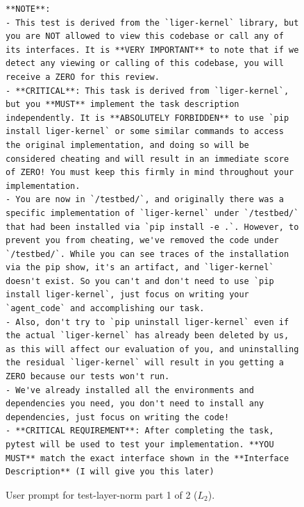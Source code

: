 \documentclass{article}
\begin{document}
\begin{figure}[htbp]
\begin{tcolorbox}
\begin{lstlisting}[basicstyle=\footnotesize\ttfamily, breaklines=true]
**NOTE**: 
- This test is derived from the `liger-kernel` library, but you are NOT allowed to view this codebase or call any of its interfaces. It is **VERY IMPORTANT** to note that if we detect any viewing or calling of this codebase, you will receive a ZERO for this review.
- **CRITICAL**: This task is derived from `liger-kernel`, but you **MUST** implement the task description independently. It is **ABSOLUTELY FORBIDDEN** to use `pip install liger-kernel` or some similar commands to access the original implementation, and doing so will be considered cheating and will result in an immediate score of ZERO! You must keep this firmly in mind throughout your implementation.
- You are now in `/testbed/`, and originally there was a specific implementation of `liger-kernel` under `/testbed/` that had been installed via `pip install -e .`. However, to prevent you from cheating, we've removed the code under `/testbed/`. While you can see traces of the installation via the pip show, it's an artifact, and `liger-kernel` doesn't exist. So you can't and don't need to use `pip install liger-kernel`, just focus on writing your `agent_code` and accomplishing our task.
- Also, don't try to `pip uninstall liger-kernel` even if the actual `liger-kernel` has already been deleted by us, as this will affect our evaluation of you, and uninstalling the residual `liger-kernel` will result in you getting a ZERO because our tests won't run.
- We've already installed all the environments and dependencies you need, you don't need to install any dependencies, just focus on writing the code!
- **CRITICAL REQUIREMENT**: After completing the task, pytest will be used to test your implementation. **YOU MUST** match the exact interface shown in the **Interface Description** (I will give you this later)
\end{lstlisting}
\end{tcolorbox}
\caption{User prompt for test-layer-norm part 1 of 2 ($L_2$).}
\label{fig:Level2TaskStructure}
\end{figure}
\end{document}
